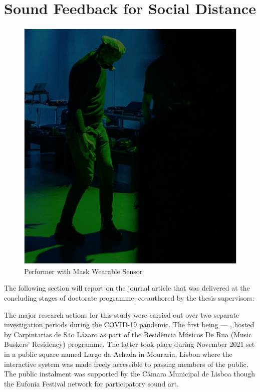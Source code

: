 
\section{Sound Feedback for Social Distance}
\label{case_studies:adse_ess}

\begin{figure}[!h]
\captionsetup{width=1.0\textwidth}
\centering
\includegraphics[width=0.75
\textwidth,keepaspectratio]{Chapters/Figures/adse_ess/CSL_MASK_MICK.png}
{\caption{Performer with Mask Wearable Sensor
}\label{fig:sensor_model}}
\end{figure}

The following section will report on the journal article that was delivered at the concluding stages of doctorate programme, co-authored by the thesis supervisors: 


The major research actions for this study were carried out over two separate investigation periods during the COVID-19 pandemic. The first being --- , hosted by Carpintarias de São Lázaro as part of the Residência Músicos De Rua (Music Buskers' Residency) programme. The latter took place during November 2021 set in a public square named Largo da Achada in Mouraria, Lisbon where the interactive system was made freely accessible to passing members of the public. The public instalment was supported by the Câmara Municipal de Lisboa though the Eufonia Festival network for participatory sound art. 

